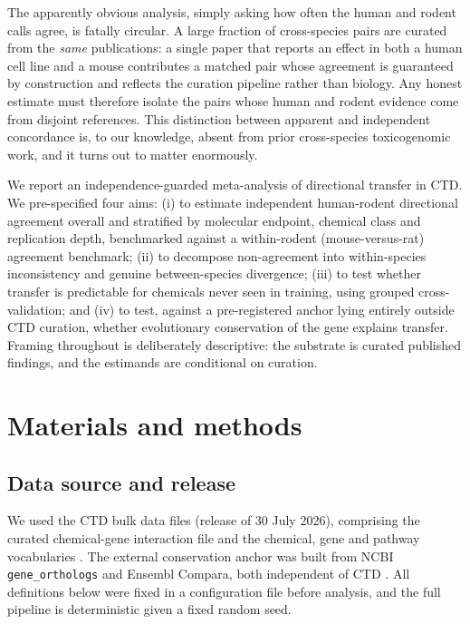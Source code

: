 \documentclass[review,12pt,authoryear]{elsarticle}
\begin{document}
The apparently obvious analysis, simply asking how often the human and rodent
calls agree, is fatally circular. A large fraction of cross-species pairs are
curated from the \emph{same} publications: a single paper that reports an effect
in both a human cell line and a mouse contributes a matched pair whose agreement
is guaranteed by construction and reflects the curation pipeline rather than
biology. Any honest estimate must therefore isolate the pairs whose human and
rodent evidence come from disjoint references. This distinction between
apparent and independent concordance is, to our knowledge, absent from prior
cross-species toxicogenomic work, and it turns out to matter enormously.

We report an independence-guarded meta-analysis of directional transfer in CTD.
We pre-specified four aims: (i) to estimate independent human-rodent directional
agreement overall and stratified by molecular endpoint, chemical class and
replication depth, benchmarked against a within-rodent (mouse-versus-rat)
agreement benchmark; (ii) to decompose non-agreement into within-species
inconsistency and genuine between-species divergence; (iii) to test whether
transfer is predictable for chemicals never seen in training, using
grouped cross-validation; and (iv) to test, against a pre-registered anchor
lying entirely outside CTD curation, whether evolutionary conservation of the
gene explains transfer. Framing throughout is deliberately descriptive: the
substrate is curated published findings, and the estimands are conditional on
curation.

\section{Materials and methods}

\subsection{Data source and release}

We used the CTD bulk data files (release of 30 July 2026), comprising the
curated chemical-gene interaction file and the chemical, gene and pathway
vocabularies \citep{davis2025ctd}. The external conservation anchor was built
from NCBI \texttt{gene\_orthologs} and Ensembl Compara, both independent of CTD
\citep{brown2015ncbigene,austine2025ensembl}.
All definitions below were fixed in a configuration file before analysis, and
the full pipeline is deterministic given a fixed random seed.
\end{document}
